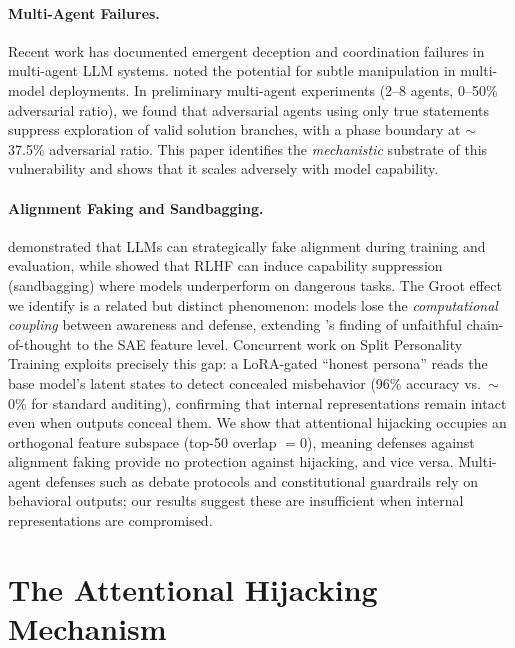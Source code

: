 \documentclass[10pt,twocolumn]{article}
\begin{document}
\paragraph{Multi-Agent Failures.}
Recent work has documented emergent deception \citep{park2023generative} and coordination failures in multi-agent LLM systems.
\citet{anthropic2026claude} noted the potential for subtle manipulation in multi-model deployments.
In preliminary multi-agent experiments (2--8 agents, 0--50\% adversarial ratio), we found that adversarial agents using only true statements suppress exploration of valid solution branches, with a phase boundary at $\sim$37.5\% adversarial ratio.
This paper identifies the \emph{mechanistic} substrate of this vulnerability and shows that it scales adversely with model capability.

\paragraph{Alignment Faking and Sandbagging.}
\citet{greenblatt2024alignment} demonstrated that LLMs can strategically fake alignment during training and evaluation, while \citet{vanderweij2024sandbagging} showed that RLHF can induce capability suppression (sandbagging) where models underperform on dangerous tasks.
The Groot effect we identify is a related but distinct phenomenon: models lose the \emph{computational coupling} between awareness and defense, extending \citet{turpin2023language}'s finding of unfaithful chain-of-thought to the SAE feature level.
Concurrent work on Split Personality Training \citep{dietz2026spt} exploits precisely this gap: a LoRA-gated ``honest persona'' reads the base model's latent states to detect concealed misbehavior (96\% accuracy vs.\ $\sim$0\% for standard auditing), confirming that internal representations remain intact even when outputs conceal them.
We show that attentional hijacking occupies an orthogonal feature subspace (top-50 overlap $= 0$), meaning defenses against alignment faking provide no protection against hijacking, and vice versa.
Multi-agent defenses such as debate protocols \citep{irving2018ai} and constitutional guardrails rely on behavioral outputs; our results suggest these are insufficient when internal representations are compromised.

\section{The Attentional Hijacking Mechanism}
\label{sec:mechanism}
\end{document}
